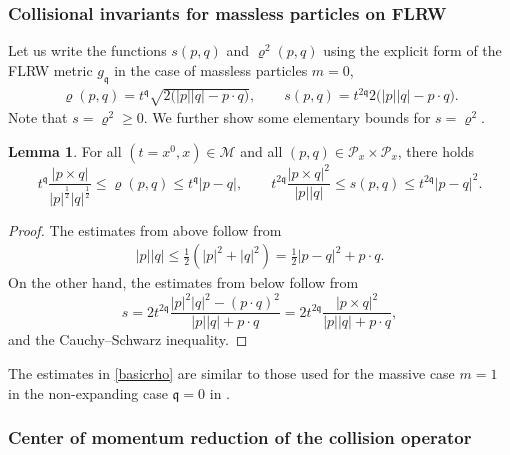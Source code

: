 \documentclass[reqno]{amsart}
\newcommand{\pv}{p}
\newcommand{\pZ}{|\pv|}
\newcommand{\qv}{q}
\newcommand{\qZ}{|\qv|}
\newcommand{\qq}{\mathfrak{q}}
\newcommand{\tq}{t^{\qq}}
\newcommand{\tqq}{t^{2\qq}}
\newcommand{\mrel}{\varrho}
\theoremstyle{definition}
\newtheorem{lemma}[theorem]{Lemma}
\numberwithin{equation}{section}
\numberwithin{theorem}{section}
\begin{document}
\subsubsection{Collisional invariants for massless particles on FLRW}

Let us write the functions \(s(p,q)\) and \(\varrho^2(p,q)\) using the explicit form of the FLRW metric \(g_{\qq}\) in the case of massless particles \(m=0\),
\begin{align}
\mrel(p,q) 
 =\tq \sqrt{2\big(\pZ \qZ - p\cdot q\big)},\qquad s(p,q)
= \tqq 2\big(\pZ\qZ - p\cdot q\big).\label{sDEFINITIONFLRW}
\end{align} 
Note that \(s=\varrho^2\geq 0.\) We further show some elementary bounds for \(s=\varrho^2\).

\begin{lemma} 
For all \((t=x^0,x)\in \mathcal{M}\) and all \((p,q)\in \mathcal{P}_x\times \mathcal{P}_x\), there holds
\begin{equation}\label{basicrho}
      \tq \frac{|p\times q|}{\pZ^{\frac{1}{2}}\qZ^{\frac{1}{2}} }\leq \mrel(p,q) \leq \tq |\pv-\qv|, \qquad \tqq \frac{|p\times q|^2}{\pZ\qZ }\leq s(p,q)  \leq   \tqq |\pv-\qv|^2.
\end{equation}
\end{lemma}

\begin{proof}
    The estimates from above follow from  
    \begin{align*}
  |\pv| | \qv| \leq   \frac{1}{2}\left(|\pv|^2+ |\qv|^2\right)
    = \frac{1}{2}|\pv-\qv|^2 + \pv \cdot \qv.
\end{align*}
On the other hand, the estimates from below follow from 
\begin{equation}\label{mrel.upper.est}
    s = 2\tqq \frac{\pZ^2\qZ^2 - (p\cdot q)^2}{\pZ\qZ + p\cdot q}
    = 2\tqq \frac{|p\times q|^2}{\pZ\qZ + p\cdot q},
\end{equation}
and the Cauchy--Schwarz inequality.
\end{proof}


The estimates in \eqref{basicrho} are similar to those used for the massive case \(m=1\) in the non-expanding case \(\qq=0\) in \cite[Lemma 3.1]{MR1211782}. 



\subsubsection{Center of momentum reduction of the collision operator}
\end{document}
